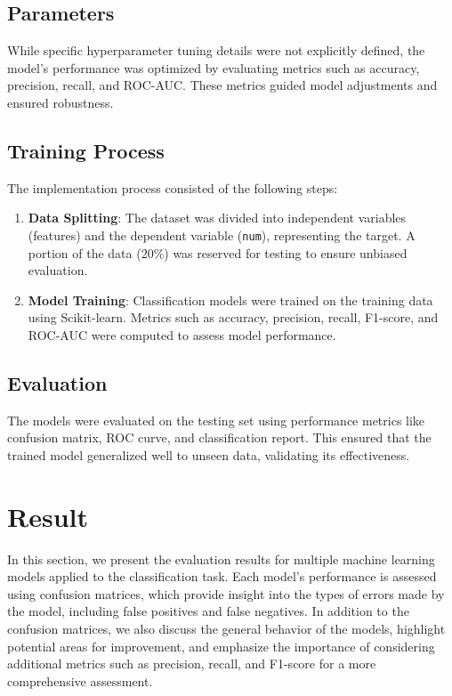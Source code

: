 \documentclass[pdflatex,sn-nature,Numbered]{sn-jnl}%
\theoremstyle{thmstyleone}%
\theoremstyle{thmstyletwo}%
\theoremstyle{thmstylethree}%
\begin{document}
\subsection{Parameters}
While specific hyperparameter tuning details were not explicitly defined, the model's performance was optimized by evaluating metrics such as accuracy, precision, recall, and ROC-AUC. These metrics guided model adjustments and ensured robustness.

\subsection{Training Process}
The implementation process consisted of the following steps:
\begin{enumerate}
    \item \textbf{Data Splitting}: The dataset was divided into independent variables (features) and the dependent variable (\texttt{num}), representing the target. A portion of the data (20\%) was reserved for testing to ensure unbiased evaluation.
    \item \textbf{Model Training}: Classification models were trained on the training data using Scikit-learn. Metrics such as accuracy, precision, recall, F1-score, and ROC-AUC were computed to assess model performance.
\end{enumerate}

\subsection{Evaluation}
The models were evaluated on the testing set using performance metrics like confusion matrix, ROC curve, and classification report. This ensured that the trained model generalized well to unseen data, validating its effectiveness.


\section{Result}
In this section, we present the evaluation results for multiple machine learning models applied to the classification task. Each model's performance is assessed using confusion matrices, which provide insight into the types of errors made by the model, including false positives and false negatives. In addition to the confusion matrices, we also discuss the general behavior of the models, highlight potential areas for improvement, and emphasize the importance of considering additional metrics such as precision, recall, and F1-score for a more comprehensive assessment.
\end{document}
